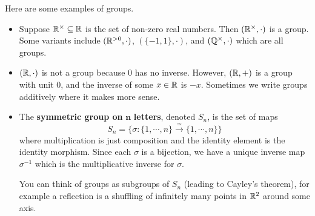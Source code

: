 \begin{example}
  Here are some examples of groups.
  \begin{itemize}
  \setlength\itemsep{-.2em}
      \item Suppose $\mathbb{R}^{\times }\subseteq \mathbb{R}$ is the set of non-zero real numbers. Then $(\mathbb{R} ^{\times }, \cdot )$ is a group. Some variants include $(\mathbb{R}^{>0}, \cdot )$, $(\{-1,1\} ,\cdot )$, and $(\mathbb{Q}^{\times },\cdot )$ which are all groups.
      \item $(\mathbb{R},\cdot )$ is not a group because 0 has no inverse. However, $(\mathbb{R},+)$ is a group with unit 0, and the inverse of some $x \in \mathbb{R}$ is $-x$.
  Sometimes we write groups additively where it makes more sense.
\item The \textbf{symmetric group on} $\mathbf n$ \textbf{letters}, denoted $S_n $, is the set of maps \[
S _n = \{\sigma \colon \{1, \cdots ,n\}  \xrightarrow{\simeq } \{1,\cdots ,n\}   \} 
\] where multiplication is just composition and the identity element is the identity morphism. Since each $\sigma$ is a bijection, we have a unique inverse map $\sigma^{-1}$ which is the multiplicative inverse for $\sigma$.  

You can think of groups as subgroups of $S_n $ (leading to Cayley's theorem), for example a reflection is a shuffling of infinitely many points in $\mathbb{R}^2$ around some axis.
  \end{itemize}
\end{example}
